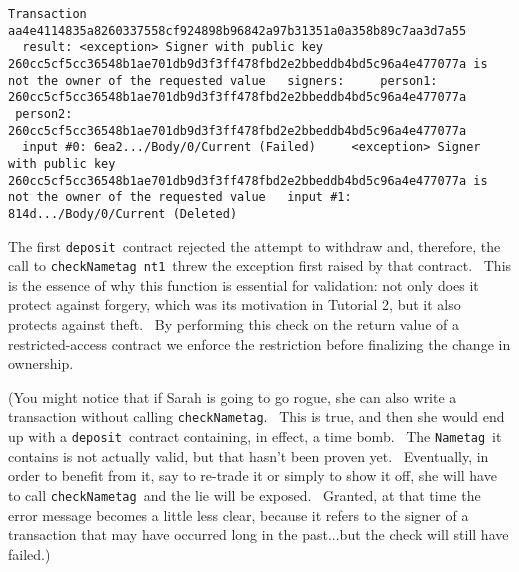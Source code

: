 \documentclass[11pt]{article}
\newcommand{\codeblock}[1]{\begin{mdframed}[
    backgroundcolor=header-color,
    linecolor=header-color,
    innertopmargin=10pt,
    ]{\texttt{#1}}\end{mdframed}}
\begin{document}
\codeblock{Transaction aa4e4114835a8260337558cf924898b96842a97b31351a0a358b89c7aa3d7a55\newline
  result: \textless{}exception\textgreater{} Signer with public key 260cc5cf5cc36548b1ae701db9d3f3ff478fbd2e2bbeddb4bd5c96a4e477077a is not the owner of the requested value\newline
  signers:\newline
    person1: 260cc5cf5cc36548b1ae701db9d3f3ff478fbd2e2bbeddb4bd5c96a4e477077a\newline
    person2: 260cc5cf5cc36548b1ae701db9d3f3ff478fbd2e2bbeddb4bd5c96a4e477077a\newline
  input \#0: 6ea2...\slash{}Body\slash{}0\slash{}Current (Failed)\newline
    \textless{}exception\textgreater{} Signer with public key 260cc5cf5cc36548b1ae701db9d3f3ff478fbd2e2bbeddb4bd5c96a4e477077a is not the owner of the requested value\newline
  input \#1: 814d...\slash{}Body\slash{}0\slash{}Current (Deleted)}

The first \texttt{deposit} contract rejected the attempt to withdraw and, therefore, the call to \texttt{checkNametag nt1} threw the exception first raised by that contract.  This is the essence of why this function is essential for validation: not only does it protect against forgery, which was its motivation in Tutorial 2, but it also protects against theft.  By performing this check on the return value of a restricted-access contract we enforce the restriction before finalizing the change in ownership.


\vspace{11pt}

(You might notice that if Sarah is going to go rogue, she can also write a transaction without calling \texttt{checkNametag}.  This is true, and then she would end up with a \texttt{deposit} contract containing, in effect, a time bomb.  The \texttt{Nametag} it contains is not actually valid, but that hasn't been proven yet.  Eventually, in order to benefit from it, say to re-trade it or simply to show it off, she will have to call \texttt{checkNametag} and the lie will be exposed.  Granted, at that time the error message becomes a little less clear, because it refers to the signer of a transaction that may have occurred long in the past...but the check will still have failed.)

\end{document}
